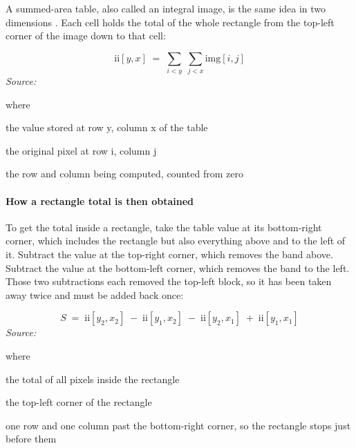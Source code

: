 A summed-area table, also called an integral image, is the same idea in two dimensions \cite{crow1984}. Each cell holds the total of the whole rectangle from the top-left corner of the image down to that cell:


\begin{equation}
\mathrm{ii}[y,x] \;=\; \sum_{i<y}\;\sum_{j<x} \mathrm{img}[i,j]
\end{equation}
\noindent\emph{Source: }\cite{crow1984}


\noindent where
\begin{description}[leftmargin=2.4em,style=nextline,font=\normalfont\ttfamily]\setlength\itemsep{1pt}
  \item[{$\mathrm{ii}[y,x]$}] \normalfont the value stored at row y, column x of the table
  \item[{$\mathrm{img}[i,j]$}] \normalfont the original pixel at row i, column j
  \item[{$y, x$}] \normalfont the row and column being computed, counted from zero
\end{description}

\paragraph{How a rectangle total is then obtained}
To get the total inside a rectangle, take the table value at its bottom-right corner, which includes the rectangle but also everything above and to the left of it. Subtract the value at the top-right corner, which removes the band above. Subtract the value at the bottom-left corner, which removes the band to the left. Those two subtractions each removed the top-left block, so it has been taken away twice and must be added back once:


\begin{equation}
S \;=\; \mathrm{ii}[y_2,x_2] \;-\; \mathrm{ii}[y_1,x_2]\;-\; \mathrm{ii}[y_2,x_1] \;+\; \mathrm{ii}[y_1,x_1]
\end{equation}
\noindent\emph{Source: }\cite{crow1984}


\noindent where
\begin{description}[leftmargin=2.4em,style=nextline,font=\normalfont\ttfamily]\setlength\itemsep{1pt}
  \item[{$S$}] \normalfont the total of all pixels inside the rectangle
  \item[{$y_1, x_1$}] \normalfont the top-left corner of the rectangle
  \item[{$y_2, x_2$}] \normalfont one row and one column past the bottom-right corner, so the rectangle stops just before them
\end{description}


